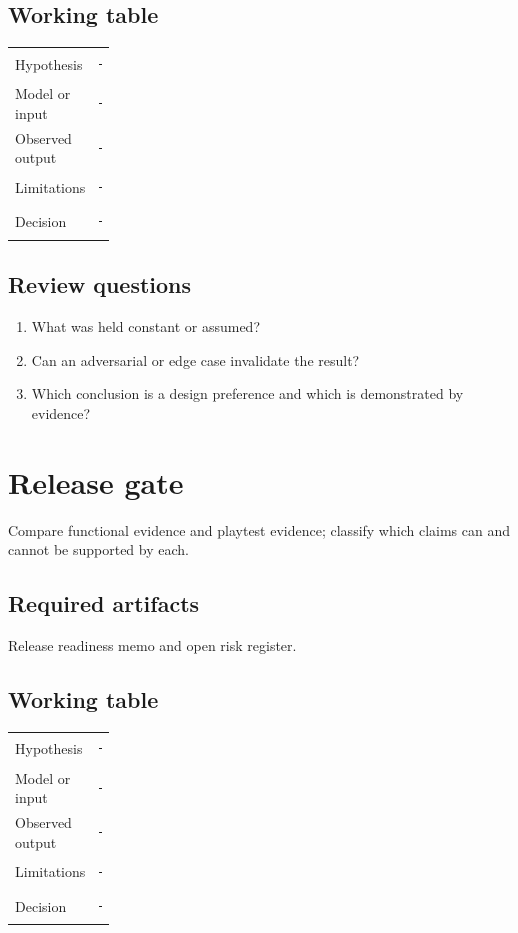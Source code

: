 \documentclass[11pt]{article}
\begin{document}
\subsection{Working table}
\begin{tabularx}{\linewidth}{@{}p{0.20\linewidth}X@{}}\toprule
Hypothesis & \rule{0.90\linewidth}{0.4pt}\\[0.35cm]
Model or input & \rule{0.90\linewidth}{0.4pt}\\[0.35cm]
Observed output & \rule{0.90\linewidth}{0.4pt}\\[0.35cm]
Limitations & \rule{0.90\linewidth}{0.4pt}\\[0.35cm]
Decision & \rule{0.90\linewidth}{0.4pt}\\\bottomrule\end{tabularx}

\subsection{Review questions}
\begin{enumerate}
\item What was held constant or assumed?
\item Can an adversarial or edge case invalidate the result?
\item Which conclusion is a design preference and which is demonstrated by evidence?
\end{enumerate}

\section{Release gate}
Compare functional evidence and playtest evidence; classify which claims can and cannot be supported by each.


\subsection{Required artifacts}
Release readiness memo and open risk register.


\subsection{Working table}
\begin{tabularx}{\linewidth}{@{}p{0.20\linewidth}X@{}}\toprule
Hypothesis & \rule{0.90\linewidth}{0.4pt}\\[0.35cm]
Model or input & \rule{0.90\linewidth}{0.4pt}\\[0.35cm]
Observed output & \rule{0.90\linewidth}{0.4pt}\\[0.35cm]
Limitations & \rule{0.90\linewidth}{0.4pt}\\[0.35cm]
Decision & \rule{0.90\linewidth}{0.4pt}\\\bottomrule\end{tabularx}
\end{document}
